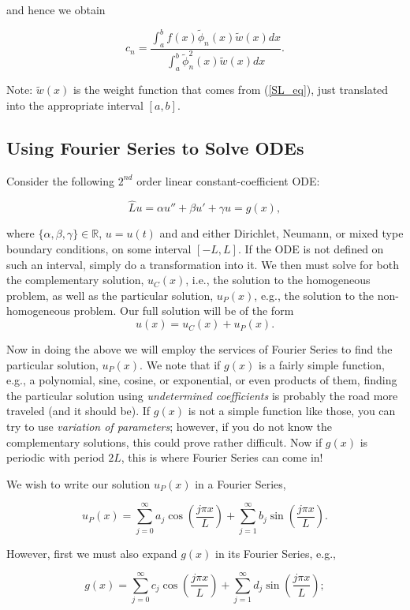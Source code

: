 and hence we obtain

$$c_n = \frac{  \int_{a}^{b} f(x) \tilde{\phi}_n(x) \tilde{w}(x) dx    } { \int_a^b  \tilde{\phi}^2_n(x) \tilde{w}(x) dx  }.$$

Note: $\tilde{w}(x)$ is the weight function that comes from (\ref{SL_eq}), just translated into the appropriate interval $[a,b]$.


%
%
%
%
\subsection{Using Fourier Series to Solve ODEs}

Consider the following $2^{nd}$ order linear constant-coefficient ODE:

$$\hat{L}u = \alpha u'' + \beta u' + \gamma u = g(x),$$

where $\{\alpha, \beta, \gamma\}\in\mathbb{R}$, $u=u(t)$ and and either Dirichlet, Neumann, or mixed type  boundary conditions, on some interval $[-L,L]$. If the ODE is not defined on such an interval, simply do a transformation into it. We then must solve for both the complementary solution, $u_C(x)$, i.e., the solution to the homogeneous problem, as well as the particular solution, $u_P(x)$, e.g., the solution to the non-homogeneous problem. Our full solution will be of the form $$u(x) = u_C(x) + u_P(x).$$

Now in doing the above we will employ the services of Fourier Series to find the particular solution, $u_P(x).$ We note that if $g(x)$ is a fairly simple function, e.g., a polynomial, sine, cosine, or exponential, or even products of them, finding the particular solution using \emph{undetermined coefficients} is probably the road more traveled (and it should be). If $g(x)$ is not a simple function like those, you can try to use \emph{variation of parameters}; however, if you do not know the complementary solutions, this could prove rather difficult. Now if $g(x)$ is periodic with period $2L$, this is where Fourier Series can come in!

 We wish to write our solution $u_P(x)$ in a Fourier Series, 

$$u_P(x) =  \sum_{j=0}^{\infty} a_j \cos\left( \frac{j\pi x}{L} \right ) +  \sum_{j=1}^{\infty} b_j \sin\left( \frac{j\pi x}{L} \right ).$$

However, first we must also expand $g(x)$ in its Fourier Series, e.g.,

$$g(x) =  \sum_{j=0}^{\infty} c_j \cos\left( \frac{j\pi x}{L} \right ) +  \sum_{j=1}^{\infty} d_j \sin\left( \frac{j\pi x}{L} \right );$$

